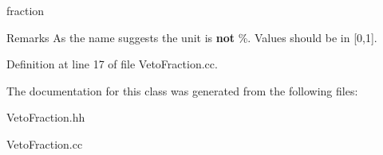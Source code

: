 fraction 

\begin{DoxyRemark}{Remarks}
As the name suggests the unit is {\bfseries not} \%. Values should be in [0,1]. 
\end{DoxyRemark}


Definition at line 17 of file Veto\-Fraction.\-cc.



The documentation for this class was generated from the following files\-:\begin{DoxyCompactItemize}
\item 
Veto\-Fraction.\-hh\item 
Veto\-Fraction.\-cc\end{DoxyCompactItemize}
